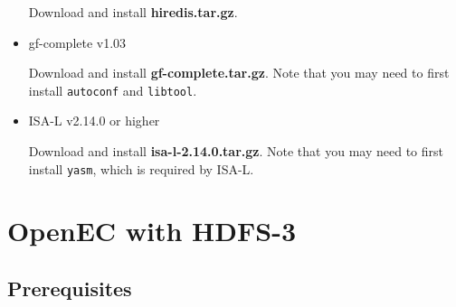 \documentclass[letterpaper,12pt]{article}
\begin{document}
\begin{itemize}
Download and install {\bf hiredis.tar.gz}. 

\begin{center}
\noindent{}
\end{center}

\item gf-complete v1.03

Download and install {\bf gf-complete.tar.gz}.  Note that you may need to
first install {\tt autoconf} and {\tt libtool}. 

\begin{center}
\noindent{}
\end{center}

\item ISA-L v2.14.0 or higher

Download and install {\bf isa-l-2.14.0.tar.gz}. Note that you may need to
first install {\tt yasm}, which is required by ISA-L.

\begin{center}
\noindent{}
\end{center}
	
\end{itemize}

\section{OpenEC with HDFS-3}
\label{sec:hdfs3}

\subsection{Prerequisites}
\end{document}
